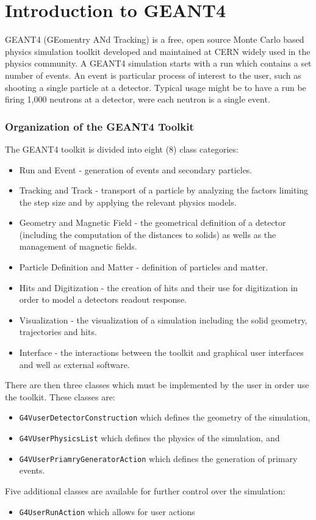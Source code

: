 \section{Introduction to GEANT4}
\label{sec:G4Intro}

GEANT4 (GEomentry ANd Tracking) is a free, open source Monte Carlo based physics simulation toolkit developed and maintained at CERN widely used in the physics community.
A GEANT4 simulation starts with a run which contains a set number of events.
An event is particular process of interest to the user, such as shooting a single particle at a detector. 
Typical usage might be to have a run be firing 1,000 neutrons at a detector, were each neutron is a single event.

\subsubsection{Organization of the GEANT4 Toolkit}
The GEANT4 toolkit is divided into eight (8) class categories:
\begin{itemize}
    \item Run and Event - generation of events and secondary particles.
    \item Tracking and Track - transport of a particle by analyzing the factors limiting the step size and by applying the relevant physics models.
    \item Geometry and Magnetic Field - the geometrical definition of a detector (including the computation of the distances to solids) as wells as the management of magnetic fields.
    \item Particle Definition and Matter - definition of particles and matter.
    \item Hits and Digitization - the creation of hits and their use for digitization in order to model a detectors readout response.
    \item Visualization - the visualization of a simulation including the solid geometry, trajectories and hits.
    \item Interface - the interactions between the toolkit and graphical user interfaces and well as external software.
\end{itemize}

There are then three classes which must be implemented by the user in order use the toolkit. These classes are:
\begin{itemize}
    \item \verb+G4VuserDetectorConstruction+ which defines the geometry of the simulation,
    \item \verb+G4VUserPhysicsList+ which defines the physics of the simulation, and
    \item \verb+G4VUserPriamryGeneratorAction+ which defines the generation of primary events.
\end{itemize}
Five additional classes are available for further control over the simulation:
\begin{itemize}
    \item \verb+G4UserRunAction+ which allows for user actions
\end{itemize}
